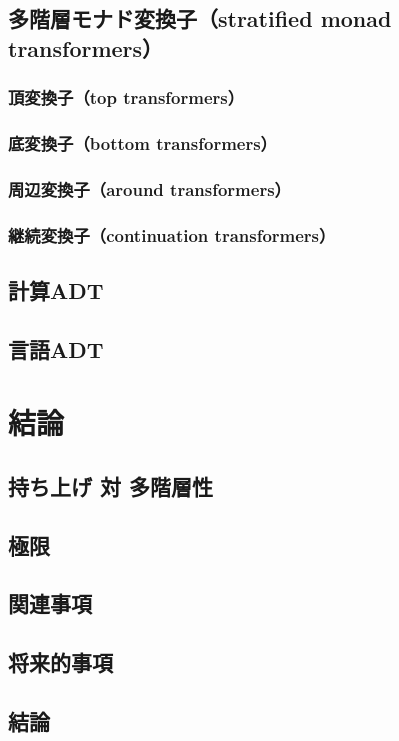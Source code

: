 \documentclass[11pt, oneside]{jsarticle}   	%
\begin{document}
\subsection{ 多階層モナド変換子（stratified monad transformers） }
\subsubsection{ 頂変換子（top transformers） }
\subsubsection{ 底変換子（bottom transformers） }
\subsubsection{ 周辺変換子（around transformers） }
\subsubsection{ 継続変換子（continuation transformers） }
\subsection{ 計算ADT }
\subsection{ 言語ADT }

\newpage
\section{ 結論 }
\subsection{ 持ち上げ 対 多階層性 }
\subsection{ 極限 }
\subsection{ 関連事項 }
\subsection{ 将来的事項 }
\subsection{ 結論 }
\end{document}
